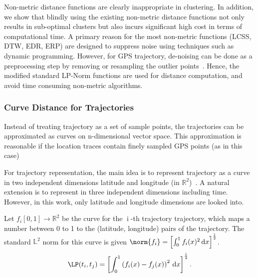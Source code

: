 Non-metric distance functions are clearly inappropriate in clustering. In addition, we show that blindly using the existing non-metric distance functions not only results in sub-optimal clusters but also incurs significant high cost in terms of computational time. A primary reason for the most non-metric functions (LCSS, DTW, EDR, ERP) are designed to suppress noise using techniques such as dynamic programming. However, for GPS trajectory, de-noising can be done as a preprocessing step by removing or resampling the outlier points~\cite{Yuan2013,Zheng2009}. Hence, the modified standard LP-Norm functions are used for distance computation, and avoid time consuming non-metric algorithms.

\subsubsection{Curve Distance for Trajectories}
Instead of treating trajectory as a set of sample points, the trajectories can be approximated as curves on n-dimensional vector space. This approximation is reasonable if the location traces contain finely sampled GPS points (as in this case)%

For trajectory representation, the main idea is to represent trajectory as a curve in two independent dimensions latitude and longitude (in $\mathbb{R}^2$)~\cite{Kurtek2012}. A natural extension is to represent in three independent dimensions including time. However, in this work, only latitude and longitude dimensions are looked into. %

Let $f_i[0,1] \rightarrow \mathbb{R}^2$ be the curve for the $\operatorname{i}$-th trajectory trajectory, which maps a number between 0 to 1 to the (latitude, longitude) pairs of the trajectory. The standard $\mathbb{L}^2$ norm for this curve is given $\norm{f_i} = \left[ \int_{0}^{1}{f_i(x)^2\, \mathrm{d}x }\right] ^ {\frac{1}{2}}$. %
\begin{align}
\LP(t_i,t_j) = \left[ \int_{0}^{1}{\left(f_i(x) - f_j(x) \right )^2\, \mathrm{d}x }\right] ^ {\frac{1}{2}}.
\end{align}

